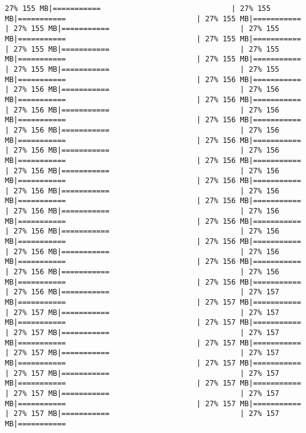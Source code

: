 \documentclass[
]{article}
\begin{document}
\begin{verbatim}
27% 155 MB|===========                              | 27% 155 MB|===========                              | 27% 155 MB|===========                              | 27% 155 MB|===========                              | 27% 155 MB|===========                              | 27% 155 MB|===========                              | 27% 155 MB|===========                              | 27% 155 MB|===========                              | 27% 155 MB|===========                              | 27% 155 MB|===========                              | 27% 155 MB|===========                              | 27% 156 MB|===========                              | 27% 156 MB|===========                              | 27% 156 MB|===========                              | 27% 156 MB|===========                              | 27% 156 MB|===========                              | 27% 156 MB|===========                              | 27% 156 MB|===========                              | 27% 156 MB|===========                              | 27% 156 MB|===========                              | 27% 156 MB|===========                              | 27% 156 MB|===========                              | 27% 156 MB|===========                              | 27% 156 MB|===========                              | 27% 156 MB|===========                              | 27% 156 MB|===========                              | 27% 156 MB|===========                              | 27% 156 MB|===========                              | 27% 156 MB|===========                              | 27% 156 MB|===========                              | 27% 156 MB|===========                              | 27% 156 MB|===========                              | 27% 156 MB|===========                              | 27% 156 MB|===========                              | 27% 156 MB|===========                              | 27% 156 MB|===========                              | 27% 156 MB|===========                              | 27% 156 MB|===========                              | 27% 156 MB|===========                              | 27% 156 MB|===========                              | 27% 156 MB|===========                              | 27% 156 MB|===========                              | 27% 156 MB|===========                              | 27% 157 MB|===========                              | 27% 157 MB|===========                              | 27% 157 MB|===========                              | 27% 157 MB|===========                              | 27% 157 MB|===========                              | 27% 157 MB|===========                              | 27% 157 MB|===========                              | 27% 157 MB|===========                              | 27% 157 MB|===========                              | 27% 157 MB|===========                              | 27% 157 MB|===========                              | 27% 157 MB|===========                              | 27% 157 MB|===========                              | 27% 157 MB|===========                              | 27% 157 MB|===========                              | 27% 157 MB|===========                              | 27% 157 MB|===========                              | 27% 157 MB|===========                              | 27% 157 MB|===========   
\end{verbatim}
\end{document}
